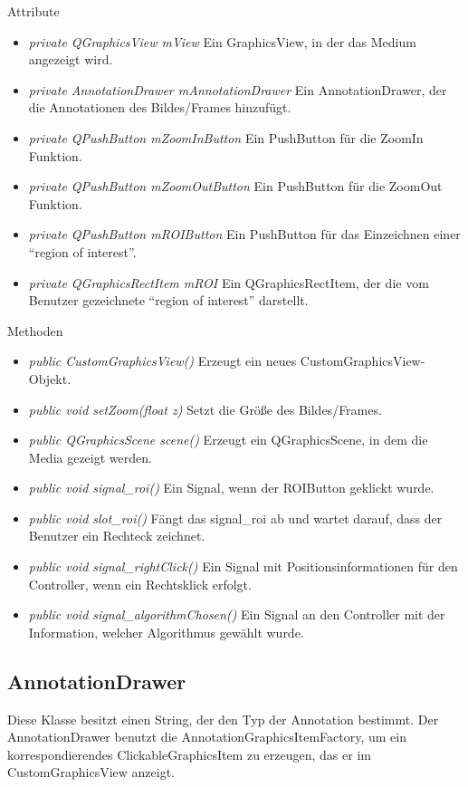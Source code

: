 Attribute
\begin{itemize}
	\item\textit{private QGraphicsView mView} 
	Ein GraphicsView, in der das Medium angezeigt wird. 
	\item\textit{private AnnotationDrawer mAnnotationDrawer} 
	Ein AnnotationDrawer, der die Annotationen des Bildes/Frames hinzufügt. 
	\item\textit{private QPushButton mZoomInButton} 
	Ein PushButton für die ZoomIn Funktion. 
	\item\textit{private QPushButton mZoomOutButton} 
	Ein PushButton für die ZoomOut Funktion.
	\item\textit{private QPushButton mROIButton} 
	Ein PushButton für das Einzeichnen einer \enquote{region of interest}.
	\item\textit{private QGraphicsRectItem mROI} 
	Ein QGraphicsRectItem, der die vom Benutzer gezeichnete \enquote{region of interest} darstellt.
\end{itemize}

Methoden
\begin{itemize}
	\item\textit{public CustomGraphicsView()} 
	Erzeugt ein neues CustomGraphicsView-Objekt.
	\item\textit{public void setZoom(float z)} 
	Setzt die Größe des Bildes/Frames.
	\item\textit{public QGraphicsScene scene()} 
	Erzeugt ein QGraphicsScene, in dem die Media gezeigt werden.
	\item\textit{public void signal\_roi()} 
	Ein Signal, wenn der ROIButton geklickt wurde.
	\item\textit{public void slot\_roi()} 
	Fängt das signal\_roi ab und wartet darauf, dass der Benutzer ein Rechteck zeichnet.
	\item\textit{public void signal\_rightClick()} 
	Ein Signal mit Positionsinformationen für den Controller, wenn ein Rechtsklick erfolgt. 
	\item\textit{public void signal\_algorithmChosen()} 
	Ein Signal an den Controller mit der Information, welcher Algorithmus gewählt wurde.
\end{itemize}

\subsection*{AnnotationDrawer}
Diese Klasse besitzt einen String, der den Typ der Annotation bestimmt. Der AnnotationDrawer benutzt die AnnotationGraphicsItemFactory, um ein korrespondierendes ClickableGraphicsItem zu erzeugen, das er im CustomGraphicsView anzeigt.

